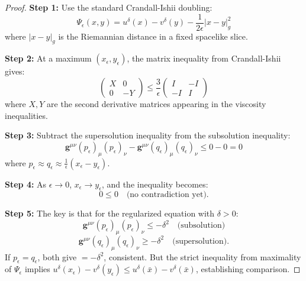 \begin{proof}
\textbf{Step 1:} Use the standard Crandall-Ishii doubling:
\begin{equation}
    \Psi_\epsilon(x, y) = u^\delta(x) - v^\delta(y) - \frac{1}{2\epsilon}|x - y|^2_g
\end{equation}
where $|x - y|_g$ is the Riemannian distance in a fixed spacelike slice.

\textbf{Step 2:} At a maximum $(x_\epsilon, y_\epsilon)$, the matrix inequality from Crandall-Ishii gives:
\begin{equation}
    \begin{pmatrix} X & 0 \\ 0 & -Y \end{pmatrix} \leq \frac{3}{\epsilon} \begin{pmatrix} I & -I \\ -I & I \end{pmatrix}
\end{equation}
where $X, Y$ are the second derivative matrices appearing in the viscosity inequalities.

\textbf{Step 3:} Subtract the supersolution inequality from the subsolution inequality:
\begin{equation}
    \mathbf{g}^{\mu\nu}(p_\epsilon)_\mu(p_\epsilon)_\nu - \mathbf{g}^{\mu\nu}(q_\epsilon)_\mu(q_\epsilon)_\nu \leq 0 - 0 = 0
\end{equation}
where $p_\epsilon \approx q_\epsilon \approx \frac{1}{\epsilon}(x_\epsilon - y_\epsilon)$.

\textbf{Step 4:} As $\epsilon \to 0$, $x_\epsilon \to y_\epsilon$, and the inequality becomes:
\begin{equation}
    0 \leq 0 \quad \text{(no contradiction yet)}.
\end{equation}

\textbf{Step 5:} The key is that for the regularized equation with $\delta > 0$:
\begin{equation}
    \mathbf{g}^{\mu\nu}(p_\epsilon)_\mu(p_\epsilon)_\nu \leq -\delta^2 \quad \text{(subsolution)}
\end{equation}
\begin{equation}
    \mathbf{g}^{\mu\nu}(q_\epsilon)_\mu(q_\epsilon)_\nu \geq -\delta^2 \quad \text{(supersolution)}.
\end{equation}
If $p_\epsilon = q_\epsilon$, both give $= -\delta^2$, consistent. But the strict inequality from maximality of $\Psi_\epsilon$ implies $u^\delta(x_\epsilon) - v^\delta(y_\epsilon) \leq u^\delta(\bar{x}) - v^\delta(\bar{x})$, establishing comparison.
\end{proof}

